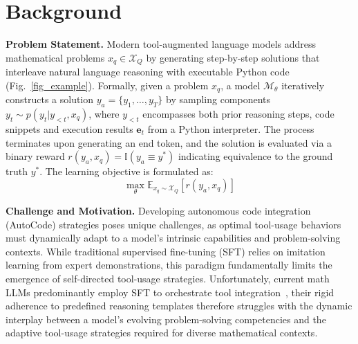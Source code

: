 \section{Background}



\textbf{Problem Statement.} Modern tool-augmented language models address mathematical problems \( x_q \in \mathcal{X}_Q \) by generating step-by-step solutions that interleave natural language reasoning with executable Python code (Fig.~\ref{fig_example}). Formally, given a problem \( x_q \), a model \( \mathcal{M}_\theta \) iteratively constructs a solution \( y_a = \{y_1, \dots, y_T\} \) by sampling components \( y_t \sim p(y_t | y_{<t}, x_q) \), where \( y_{<t} \) encompasses both prior reasoning steps, code snippets and execution results \( \mathbf{e}_t \) from a Python interpreter. The process terminates upon generating an end token, and the solution is evaluated via a binary reward \( r(y_a,x_q) = \mathbb{I}(y_a \equiv y^*) \) indicating equivalence to the ground truth \( y^* \). The learning objective is formulated as:
\[
\max_{\theta} \mathbb{E}_{x_q \sim \mathcal{X}_Q} \left[r(y_a, x_q) \right]
\]

\noindent\textbf{Challenge and Motivation.} Developing autonomous code integration (AutoCode) strategies poses unique challenges, as optimal tool-usage behaviors must dynamically adapt to a model's intrinsic capabilities and problem-solving contexts. While traditional supervised fine-tuning (SFT) relies on imitation learning from expert demonstrations, this paradigm fundamentally limits the emergence of self-directed tool-usage strategies. Unfortunately, current math LLMs predominantly employ SFT to orchestrate tool integration~\citep{mammoth, tora, dsmath, htl}, their rigid adherence to predefined reasoning templates therefore struggles with the dynamic interplay between a model’s evolving problem-solving competencies and the adaptive tool-usage strategies required for diverse mathematical contexts.

